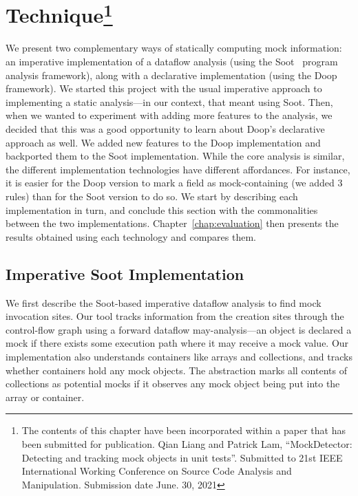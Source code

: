 \chapter[Technique]{Technique\footnote{The contents of this 
		chapter have been incorporated within a paper that has been submitted for
		publication. Qian Liang and Patrick Lam, “MockDetector: Detecting and 
		tracking mock objects in unit tests”.
		Submitted to 21st IEEE International Working Conference on 
		Source Code Analysis and Manipulation. Submission date June. 30, 2021}}
\label{chap:technique}	

We present two complementary ways of statically computing mock information: an imperative implementation of a dataflow analysis (using the Soot~\cite{Vallee-Rai:1999:SJB:781995.782008} program analysis framework), along with a declarative implementation (using the Doop~\cite{bravenboer09:_stric_declar_specif_sophis_point_analy} framework). We started this project with the usual imperative approach to implementing a static analysis---in our context, that meant using Soot. Then, when we wanted to experiment with adding more features to the analysis, we decided that this was a good opportunity to learn about Doop's declarative approach as well. We added new features to the Doop implementation and backported them to the Soot implementation. While the core analysis is similar, the different implementation technologies have different affordances. For instance, it is easier for the Doop version to mark a field as mock-containing (we added 3 rules) than for the Soot version to do so. We start by describing each implementation in turn, and conclude this section with the commonalities between the two implementations. Chapter~\ref{chap:evaluation} then presents the results obtained using each technology and compares them.

\section{Imperative Soot Implementation}
\label{sec:soot}
We first describe the Soot-based imperative dataflow analysis to find mock invocation sites. Our tool tracks information from the creation sites through the control-flow graph using a forward dataflow may-analysis---an object is declared a mock if there exists some execution path where it may receive a mock value. Our implementation also understands containers like arrays and collections, and tracks whether containers hold any mock objects. The abstraction marks all contents of collections as potential mocks if it observes any mock object being put into the array or container.


